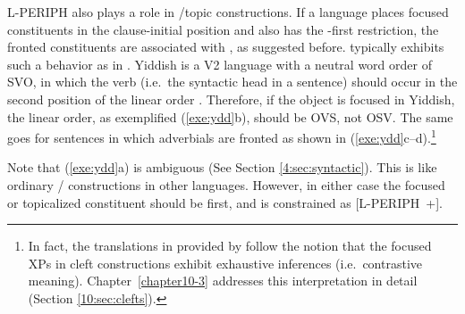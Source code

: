 L-PERIPH also plays a role in /topic 
constructions. If a language places focused constituents
in the clause-initial position and also has the -first
restriction, the fronted constituents are
associated with , as suggested
before.  typically exhibits such a behavior as in
.  Yiddish is a V2 language with a neutral word order
of SVO, in which the verb (i.e.\ the syntactic head in a sentence)
should occur in the second position of the linear order
\citep{jacobs:05}. Therefore, if the object is focused in Yiddish, the
linear order, as exemplified (\ref{exe:ydd}b), should be OVS, not
OSV. The same goes for sentences in which adverbials are
fronted as shown in (\ref{exe:ydd}c--d).\footnote{In fact, the
  translations in  provided by \citet{jacobs:05} follow
  the notion that the focused XPs in cleft constructions exhibit
  exhaustive inferences (i.e.\ contrastive
  meaning). Chapter~\ref{chapter10-3} addresses this interpretation in
  detail (Section \ref{10:sec:clefts}).}





\noindent Note that (\ref{exe:ydd}a) is ambiguous (See Section
\ref{4:sec:syntactic}). This is like ordinary /
 constructions in other languages. However, in either
case the focused or topicalized constituent should be first, and is
constrained as \mbox{[L-PERIPH +]}.



